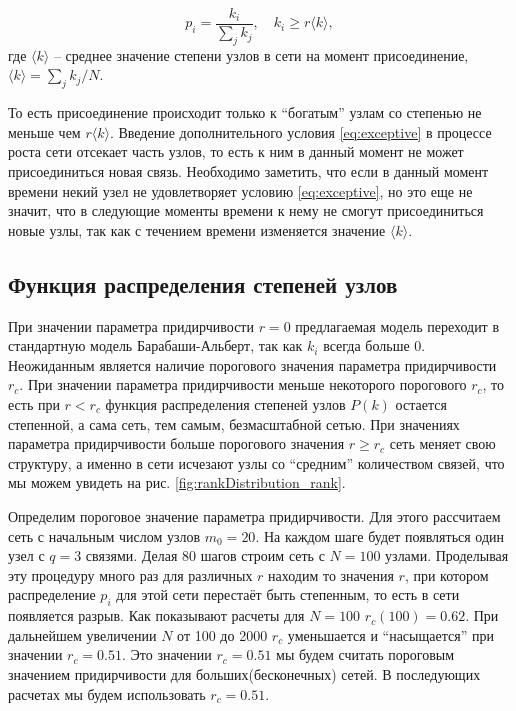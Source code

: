 \documentclass[10pt,aps,pra]{revtex4-1}
\begin{document}
            \begin{equation}\label{eq:exceptive}
                p_i = \frac{k_i}{\sum\limits_{j} k_j},\quad k_i \geq r \langle k \rangle,
            \end{equation}
                где $\langle k \rangle$ – среднее значение степени узлов в сети на момент присоединение, $\langle k \rangle = \sum\limits_{j}{k_j}/{N}$.

        То есть присоединение происходит только к ``богатым'' узлам со степенью не меньше чем $r\langle k \rangle$. Введение дополнительного условия \eqref{eq:exceptive} в процессе роста сети отсекает часть узлов, то есть к ним в данный момент не может присоединиться новая связь. Необходимо заметить, что если в данный момент времени некий узел не удовлетворяет условию \eqref{eq:exceptive}, но это еще не значит, что в следующие моменты времени к нему не смогут присоединиться новые узлы, так как с течением времени изменяется значение $\langle k \rangle$.

    \subsection{Функция распределения степеней узлов}

        При значении параметра придирчивости $r=0$ предлагаемая модель переходит в стандартную модель Барабаши-Альберт, так как $k_i$ всегда больше 0. Неожиданным является наличие порогового значения параметра придирчивости $r_c$. При значении параметра придирчивости меньше некоторого порогового $r_c$, то есть при $r<r_c$ функция распределения степеней узлов $P(k)$ остается степенной, а сама сеть, тем самым, безмасштабной сетью. При значениях параметра придирчивости больше порогового значения $r \geq r_c$ сеть меняет свою структуру, а именно в сети исчезают узлы со ``средним'' количеством связей, что мы можем увидеть на рис. \ref{fig:rankDistribution_rank}. 

        Определим пороговое значение параметра придирчивости. Для этого рассчитаем сеть с начальным числом узлов $m_0 = 20$. На каждом шаге будет появляться один узел с $q=3$ связями. Делая 80 шагов строим сеть с $N=100$ узлами. Проделывая эту процедуру много раз для различных $r$ находим то значения $r$, при котором распределение $p_i$ для этой сети перестаёт быть степенным, то есть в сети появляется разрыв. Как показывают расчеты для $N=100$ $r_c(100) = 0.62$. При дальнейшем увеличении $N$ от 100 до 2000 $r_c$ уменьшается и ``насыщается'' при значении $r_c=0.51$. Это значении $r_c=0.51$ мы будем считать пороговым значением придирчивости для больших(бесконечных) сетей. В последующих расчетах мы будем использовать $r_c=0.51$.
\end{document}
